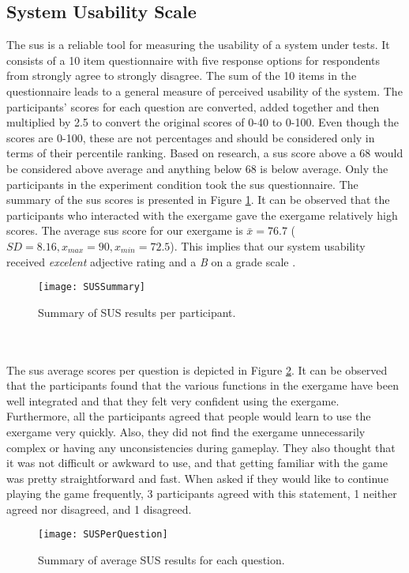 \subsection{System Usability Scale}
The \acrfull{sus} is a reliable tool for measuring the usability of a system under tests. It consists of a 10 item questionnaire with five response options for respondents from strongly agree to strongly disagree. The sum of the 10 items in the questionnaire leads to a general measure of perceived usability of the system. The participants' scores for each question are converted, added together and then multiplied by 2.5 to convert the original scores of 0-40 to 0-100. Even though the scores are 0-100, these are not percentages and should be considered only in terms of their percentile ranking. Based on research, a  \acrshort{sus} score above a 68 would be considered above average and anything below 68 is below average. Only the participants in the experiment condition took the \acrshort{sus} questionnaire. The summary of the \acrshort{sus} scores is presented in Figure \ref{fig:sus}. It can be observed that the participants who interacted with the exergame gave the exergame relatively high scores. The  average \acrshort{sus} score for our exergame  is \begin{math}\bar{x} = 76.7 \end{math} (\begin{math} SD = 8.16, x_{max}= 90, x_{min}= 72.5\end{math}). This implies that our system usability received \textit{excelent} adjective rating and a \textit{B} on a grade scale \cite{brooke2013sus}.\\
\begin{figure}[h]
    \centering
    \texttt{[image: SUSSummary]}
    \caption{Summary of SUS results per participant.}
    \label{fig:sus}
\end{figure}\\\\
The \acrshort{sus} average scores per question is depicted in Figure \ref{fig:susPerQuestion}. It can be observed that the participants found that the various functions in the exergame have been well integrated and that they felt very confident using the exergame. Furthermore, all the participants agreed that people would learn to use the exergame very quickly. Also, they did not find the exergame unnecessarily complex or having any unconsistencies during gameplay. They also thought that it was not difficult or awkward to use, and that getting familiar with the game was pretty straightforward and fast. When asked if they would like to continue playing the game frequently, 3 participants agreed with this statement, 1  neither agreed nor disagreed, and 1 disagreed. \\
\begin{figure}[h]
    \centering
    \texttt{[image: SUSPerQuestion]}
    \caption{Summary of average SUS results for each question.}
    \label{fig:susPerQuestion}
\end{figure}
